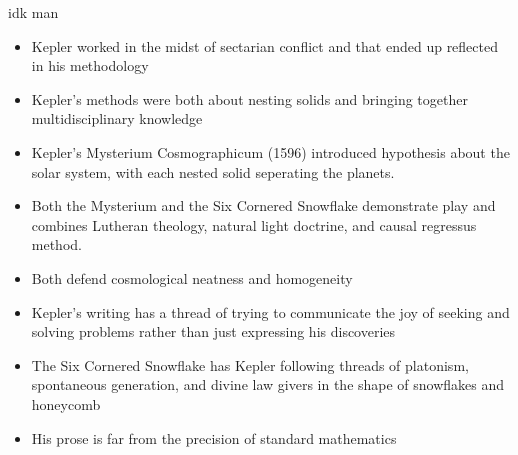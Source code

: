\documentclass{report}
\begin{document}
{\large idk man}
\begin{itemize}
    \item Kepler worked in the midst of sectarian conflict
        and that ended up reflected in his methodology
    \item Kepler's methods were both about nesting solids
        and bringing together multidisciplinary knowledge
    \item Kepler's Mysterium Cosmographicum (1596) introduced
        hypothesis about the solar system, with each
        nested solid seperating the planets.
    \item Both the Mysterium and the Six Cornered Snowflake
        demonstrate play and combines Lutheran theology,
        natural light doctrine, and causal regressus method.
    \item Both defend cosmological neatness and homogeneity
    \item Kepler's writing has a thread of trying to communicate
        the joy of seeking and solving problems rather
        than just expressing his discoveries
    \item The Six Cornered Snowflake has Kepler following threads
        of platonism, spontaneous generation, and divine
        law givers in the shape of snowflakes and honeycomb
    \item His prose is far from the precision of standard
        mathematics
\end{itemize}
\end{document}
